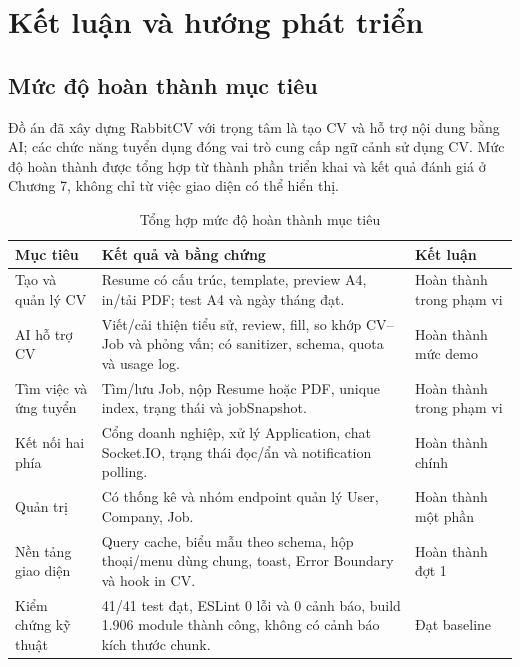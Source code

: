 \chapter{Kết luận và hướng phát triển}

\section{Mức độ hoàn thành mục tiêu}

Đồ án đã xây dựng RabbitCV với trọng tâm là tạo CV và hỗ trợ nội dung bằng AI; các chức năng tuyển dụng đóng vai trò cung cấp ngữ cảnh sử dụng CV. Mức độ hoàn thành được tổng hợp từ thành phần triển khai và kết quả đánh giá ở Chương 7, không chỉ từ việc giao diện có thể hiển thị.

\begin{table}[H]
    \centering
    \small
    \begin{tabularx}{\textwidth}{|p{}|Y|p{0.17\textwidth}|} \hline
        \textbf{Mục tiêu} & \textbf{Kết quả và bằng chứng} & \textbf{Kết luận} \\ \hline
        Tạo và quản lý CV & Resume có cấu trúc, template, preview A4, in/tải PDF; test A4 và ngày tháng đạt. & Hoàn thành trong phạm vi \\ \hline
        AI hỗ trợ CV & Viết/cải thiện tiểu sử, review, fill, so khớp CV--Job và phỏng vấn; có sanitizer, schema, quota và usage log. & Hoàn thành mức demo \\ \hline
        Tìm việc và ứng tuyển & Tìm/lưu Job, nộp Resume hoặc PDF, unique index, trạng thái và jobSnapshot. & Hoàn thành trong phạm vi \\ \hline
        Kết nối hai phía & Cổng doanh nghiệp, xử lý Application, chat Socket.IO, trạng thái đọc/ẩn và notification polling. & Hoàn thành chính \\ \hline
        Quản trị & Có thống kê và nhóm endpoint quản lý User, Company, Job. & Hoàn thành một phần \\ \hline
        Nền tảng giao diện & Query cache, biểu mẫu theo schema, hộp thoại/menu dùng chung, toast, Error Boundary và hook in CV. & Hoàn thành đợt 1 \\ \hline
        Kiểm chứng kỹ thuật & 41/41 test đạt, ESLint 0 lỗi và 0 cảnh báo, build 1.906 module thành công, không có cảnh báo kích thước chunk. & Đạt baseline \\ \hline
    \end{tabularx}
    \caption{Tổng hợp mức độ hoàn thành mục tiêu}
    \label{tab:objective-completion}
\end{table}

